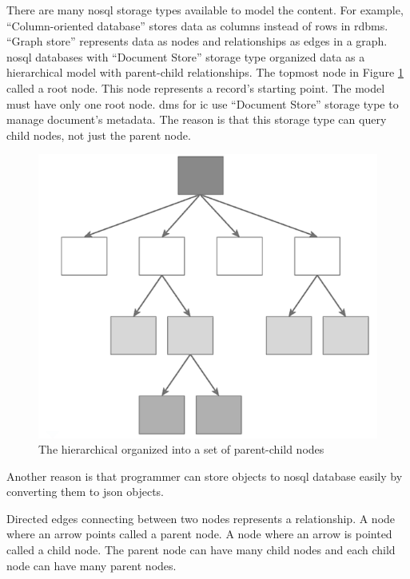 There are many \gls{nosql} storage types available to model the content.
For example, \enquote{Column-oriented database} stores data as columns instead of rows in \gls{rdbms}.
\enquote{Graph store} represents data as nodes and relationships as edges in a graph.
\gls{nosql} databases with \enquote{Document Store} storage type organized data as a hierarchical model with parent-child relationships.
The topmost node in Figure \ref{arch-node} called a root node.
This node represents a record's starting point.
The model must have only one root node.
\gls{dms} for \gls{ic} use \enquote{Document Store} storage type to manage document's metadata.
The reason is that this storage type can query child nodes, not just the parent node.
\begin{figure}[h]
	\centering
	\includegraphics[scale=0.48]{res/bg-knowledge/nosql-hierarchical}
	\caption{The hierarchical organized into a set of parent-child nodes }
	\label{arch-node}
\end{figure}
Another reason is that programmer can store objects to \gls{nosql} database easily by converting them to \gls{json} objects.

Directed edges connecting between two nodes represents a relationship.
A node where an arrow points called a parent node.
A node where an arrow is pointed called a child node.
The parent node can have many child nodes and each child node can have many parent nodes.

